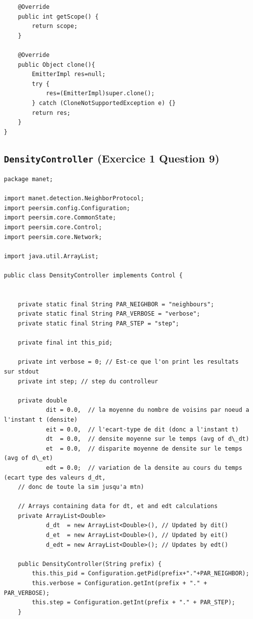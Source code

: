 \documentclass[a4paper]{article}
\begin{document}
\begin{appendix}
\begin{lstlisting}
    @Override
    public int getScope() {
        return scope;
    }

    @Override
    public Object clone(){
        EmitterImpl res=null;
        try {
            res=(EmitterImpl)super.clone();
        } catch (CloneNotSupportedException e) {}
        return res;
    }
}

\end{lstlisting}


\subsection{\texttt{DensityController} (Exercice 1 Question 9)}

\begin{lstlisting}
package manet;

import manet.detection.NeighborProtocol;
import peersim.config.Configuration;
import peersim.core.CommonState;
import peersim.core.Control;
import peersim.core.Network;

import java.util.ArrayList;

public class DensityController implements Control {


    private static final String PAR_NEIGHBOR = "neighbours";
    private static final String PAR_VERBOSE = "verbose";
    private static final String PAR_STEP = "step";

    private final int this_pid;

    private int verbose = 0; // Est-ce que l'on print les resultats sur stdout
    private int step; // step du controlleur

    private double
            dit = 0.0,  // la moyenne du nombre de voisins par noeud a l'instant t (densite)
            eit = 0.0,  // l'ecart-type de dit (donc a l'instant t)
            dt  = 0.0,  // densite moyenne sur le temps (avg of d\_dt)
            et  = 0.0,  // disparite moyenne de densite sur le temps (avg of d\_et)
            edt = 0.0;  // variation de la densite au cours du temps (ecart type des valeurs d_dt,
    // donc de toute la sim jusqu'a mtn)

    // Arrays containing data for dt, et and edt calculations
    private ArrayList<Double>
            d_dt  = new ArrayList<Double>(), // Updated by dit()
            d_et  = new ArrayList<Double>(), // Updated by eit()
            d_edt = new ArrayList<Double>(); // Updates by edt()

    public DensityController(String prefix) {
        this.this_pid = Configuration.getPid(prefix+"."+PAR_NEIGHBOR);
        this.verbose = Configuration.getInt(prefix + "." + PAR_VERBOSE);
        this.step = Configuration.getInt(prefix + "." + PAR_STEP);
    }



\end{lstlisting}
\end{appendix}
\end{document}
